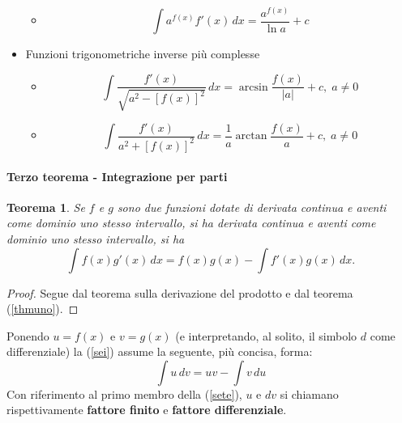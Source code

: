 \documentclass{article}
\theoremstyle{plain}
\newtheorem{thm}{Teorema}[section]
\theoremstyle{definition}
\theoremstyle{remark}
\begin{document}
\begin{multicols}{2}
\begin{itemize}
\begin{itemize}
		    \item[] \[\int a^{f(x)}f'(x) \,dx = \dfrac{a^{f(x)}}{\ln a} +c\]
        \end{itemize}
        \item Funzioni trigonometriche inverse più complesse
        \begin{itemize}
            \item[] \[\int \dfrac{f'(x)}{\sqrt{a^2-[f(x)]^2}} \,dx= \arcsin\dfrac{f(x)}{|a|} +c,\;a\neq0\]
		    \item[] \[\int \dfrac{f'(x)}{a^2+[f(x)]^2} \,dx = \dfrac{1}{a}\arctan\dfrac{f(x)}{a} +c,\;a\neq0\]
        \end{itemize}
	\end{itemize}
\end{multicols}

\vspace{10pt}

\paragraph{Terzo teorema - Integrazione per parti}
\begin{bxthm}
\begin{thm}\label{thmsei}
    Se $f$ e $g$ sono due funzioni dotate di derivata continua e aventi come dominio uno stesso intervallo, si ha derivata continua e aventi come dominio uno stesso intervallo, si ha 
    \begin{equation}
        \int f(x)g'(x)\, dx=f(x)g(x)-\int f'(x)g(x)\,dx.\label{sei}
    \end{equation}
\end{thm}
\end{bxthm}
\begin{proof}
    Segue dal teorema sulla derivazione del prodotto e dal teorema (\ref{thmuno}).
\end{proof}

\vspace{10pt}

Ponendo $u=f(x)$ e $v=g(x)$ (e interpretando, al solito, il simbolo $d$ come differenziale) la (\ref{sei}) assume la seguente, più concisa, forma:
\begin{equation}
    \int u\,dv = uv-\int v\,du \label{sete}
\end{equation}
Con riferimento al primo membro della (\ref{sete}), $u$ e $dv$ si chiamano rispettivamente \textbf{fattore finito} e \textbf{fattore differenziale}.

\vspace{10pt}
\end{document}
